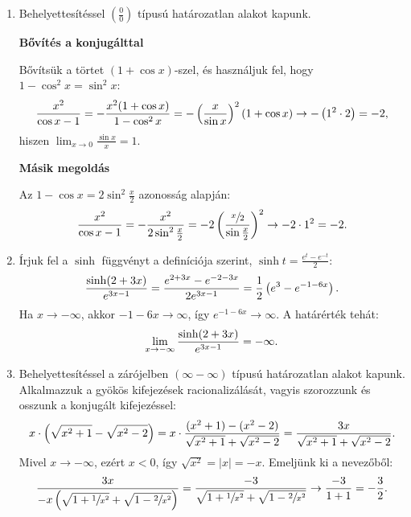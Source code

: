 \documentclass[11pt]{scrartcl}
\begin{document}
\begin{enumerate}
	\item Behelyettesítéssel $\left(\frac{0}{0}\right)$ típusú határozatlan
	      alakot kapunk.

	      \textbf{Bővítés a konjugálttal}

	      Bővítsük a törtet $(1 + \cos x)$-szel, és használjuk fel, hogy
	      $1 - \cos^2 x = \sin^2 x$:
	      \[
		      \frac{x^2}{\cos x - 1}
		      = -\frac{x^2 (1 + \cos x)}{1 - \cos^2 x}
		      = -\left( \frac{x}{\sin x} \right)^2 (1 + \cos x)
		      \to -\left(1^2 \cdot 2\right) = -2
		      \text,
	      \]
	      hiszen $\displaystyle\lim_{x \to 0} \frac{\sin x}{x} = 1$.

	      \textbf{Másik megoldás}

	      Az $1 - \cos x = 2 \sin^2 \frac{x}{2}$ azonosság alapján:
	      \[
		      \frac{x^2}{\cos x - 1}
		      = -\frac{x^2}{2 \sin^2 \frac{x}{2}}
		      = -2 \left( \frac{\sfrac{x}{2}}{\sin \frac{x}{2}} \right)^2
		      \to -2 \cdot 1^2 = -2
		      \text.
	      \]

	\item Írjuk fel a $\sinh$ függvényt a definíciója szerint,
	      $\sinh t = \frac{e^t - e^{-t}}{2}$:
	      \[
		      \frac{\sinh(2 + 3x)}{e^{3x - 1}}
		      = \frac{e^{2 + 3x} - e^{-2 - 3x}}{2 e^{3x - 1}}
		      = \frac{1}{2} \left( e^{3} - e^{-1 - 6x} \right)
		      \text.
	      \]
	      Ha $x \to -\infty$, akkor $-1 - 6x \to \infty$, így
	      $e^{-1 - 6x} \to \infty$. A határérték tehát:
	      \[
		      \lim_{x \to -\infty} \frac{\sinh(2 + 3x)}{e^{3x - 1}}
		      = -\infty
		      \text.
	      \]

	\item Behelyettesítéssel a zárójelben $(\infty - \infty)$ típusú
	      határozatlan alakot kapunk. Alkalmazzuk a gyökös kifejezések
	      racionalizálását, vagyis szorozzunk és osszunk a konjugált
	      kifejezéssel:
	      \[
		      x \cdot \left( \sqrt{x^2 + 1} - \sqrt{x^2 - 2} \right)
		      = x \cdot \frac{(x^2 + 1) - (x^2 - 2)}{\sqrt{x^2 + 1} + \sqrt{x^2 - 2}}
		      = \frac{3x}{\sqrt{x^2 + 1} + \sqrt{x^2 - 2}}
		      \text.
	      \]
	      Mivel $x \to -\infty$, ezért $x < 0$, így $\sqrt{x^2} = |x| = -x$.
	      Emeljünk ki a nevezőből:
	      \[
		      \frac{3x}{-x \left( \sqrt{1 + \sfrac{1}{x^2}} + \sqrt{1 - \sfrac{2}{x^2}} \right)}
		      = \frac{-3}{\sqrt{1 + \sfrac{1}{x^2}} + \sqrt{1 - \sfrac{2}{x^2}}}
		      \to \frac{-3}{1 + 1} = -\frac{3}{2}
		      \text.
	      \]
\end{enumerate}
\end{document}
